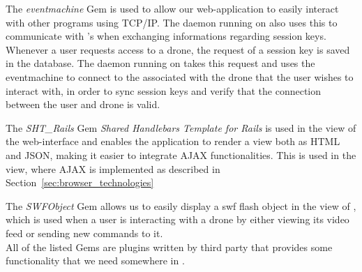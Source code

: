 The \emph{eventmachine} Gem \citep{Rails_eventmachine} is used to allow our web-application to easily interact with other programs using TCP/IP.
The daemon running on  also uses this to communicate with 's when exchanging informations regarding session keys. 
Whenever a user requests access to a drone, the request of a session key is saved in the database. 
The daemon running on  takes this request and uses the eventmachine to connect to the  associated with the drone that the user wishes to interact with, in order to sync session keys and verify that the connection between the user and drone is valid. 

The \emph{SHT\_Rails} Gem \emph{Shared Handlebars Template for Rails} \citep{Rails_sht_rails} is used in the view of the web-interface and enables the application to render a view both as HTML and JSON, making it easier to integrate AJAX functionalities.
This is used in the view, where AJAX is implemented as described in Section~\ref{sec:browser_technologies}

The \emph{SWFObject} Gem \citep{Rails_swfobject} allows us to easily display a swf flash object in the view of \projectname{}, which is used when a user is interacting with a drone by either viewing its video feed or sending new commands to it. \\

All of the listed Gems are plugins written by third party that provides some functionality that we need somewhere in \projectname{}.

